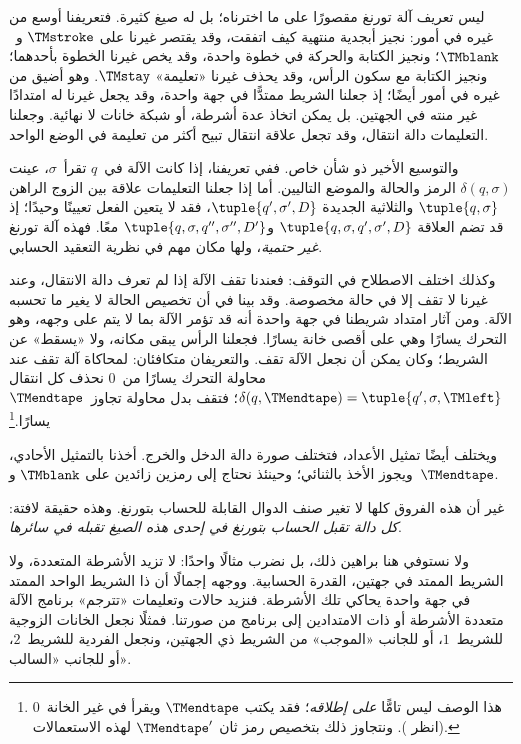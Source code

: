 \documentclass[../../../include/open-logic-section]{subfiles}
\begin{document}

ليس تعريف آلة تورنغ مقصورًا على ما اخترناه؛ بل له صيغ كثيرة. فتعريفنا أوسع من غيره في أمور: نجيز أبجدية منتهية كيف اتفقت، وقد يقتصر غيرنا على $\TMstroke$ و~$\TMblank$؛ ونجيز الكتابة والحركة في خطوة واحدة، وقد يخص غيرنا الخطوة بأحدهما؛ ونجيز الكتابة مع سكون الرأس، وقد يحذف غيرنا «تعليمة» $\TMstay$. وهو أضيق من غيره في أمور أيضًا؛ إذ جعلنا الشريط ممتدًّا في جهة واحدة، وقد يجعل غيرنا له امتدادًا غير منته في الجهتين. بل يمكن اتخاذ عدة أشرطة، أو شبكة خانات لا نهائية. وجعلنا التعليمات دالة انتقال، وقد تجعل علاقة انتقال تبيح أكثر من تعليمة في الوضع الواحد.

والتوسيع الأخير ذو شأن خاص. ففي تعريفنا، إذا كانت الآلة في~$q$ تقرأ~$\sigma$، عينت $\delta(q,\sigma)$ الرمز والحالة والموضع التاليين. أما إذا جعلنا التعليمات علاقة بين الزوج الراهن $\tuple{q,\sigma}$ والثلاثية الجديدة $\tuple{q',\sigma',D}$، فقد لا يتعين الفعل تعيينًا وحيدًا؛ إذ قد تضم العلاقة $\tuple{q,\sigma,q',\sigma',D}$ و$\tuple{q,\sigma,q'',\sigma'',D'}$ معًا. فهذه آلة تورنغ \emph{غير حتمية}، ولها مكان مهم في نظرية التعقيد الحسابي.

وكذلك اختلف الاصطلاح في التوقف: فعندنا تقف الآلة إذا لم تعرف دالة الانتقال، وعند غيرنا لا تقف إلا في حالة مخصوصة. وقد بينا في  أن تخصيص الحالة لا يغير ما تحسبه الآلة. ومن آثار امتداد شريطنا في جهة واحدة أنه قد تؤمر الآلة بما لا يتم على وجهه، وهو التحرك يسارًا وهي على أقصى خانة يسارًا. فجعلنا الرأس يبقى مكانه، ولا «يسقط» عن الشريط؛ وكان يمكن أن نجعل الآلة تقف. والتعريفان متكافئان: لمحاكاة آلة تقف عند محاولة التحرك يسارًا من~$0$ نحذف كل انتقال $\delta(q,\TMendtape)=\tuple{q',\sigma,\TMleft}$؛ فتقف بدل محاولة تجاوز~$\TMendtape$ يسارًا.\footnote{هذا الوصف ليس تامًّا \emph{على إطلاقه}؛ فقد يكتب $\TMendtape$ ويقرأ في غير الخانة~$0$ (انظر ). ونتجاوز ذلك بتخصيص رمز ثان $\TMendtape'$ لهذه الاستعمالات.}

ويختلف أيضًا تمثيل الأعداد، فتختلف صورة دالة الدخل والخرج. أخذنا بالتمثيل الأحادي، ويجوز الأخذ بالثنائي؛ وحينئذ نحتاج إلى رمزين زائدين على $\TMblank$ و~$\TMendtape$.

غير أن هذه الفروق كلها لا تغير صنف الدوال القابلة للحساب بتورنغ. وهذه حقيقة لافتة: \emph{كل دالة تقبل الحساب بتورنغ في إحدى هذه الصيغ تقبله في سائرها}.

ولا نستوفي هنا براهين ذلك، بل نضرب مثالًا واحدًا: لا تزيد الأشرطة المتعددة، ولا الشريط الممتد في جهتين، القدرة الحسابية. ووجهه إجمالًا أن ذا الشريط الواحد الممتد في جهة واحدة يحاكي تلك الأشرطة. فنزيد حالات وتعليمات «تترجم» برنامج الآلة متعددة الأشرطة أو ذات الامتدادين إلى برنامج من صورتنا. فمثلًا نجعل الخانات الزوجية للشريط~$1$، أو للجانب «الموجب» من الشريط ذي الجهتين، ونجعل الفردية للشريط~$2$، أو للجانب «السالب».
\end{document}
